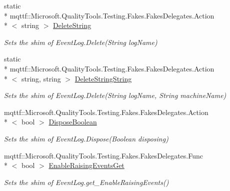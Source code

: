 \begin{DoxyCompactItemize}
static \\*
mqttf\-::\-Microsoft.\-Quality\-Tools.\-Testing.\-Fakes.\-Fakes\-Delegates.\-Action\\*
$<$ string $>$ \hyperlink{class_system_1_1_diagnostics_1_1_fakes_1_1_shim_event_log_ae24c5d172e64923387fe3a51c8167cd2}{Delete\-String}
\begin{DoxyCompactList}\small\item\em Sets the shim of Event\-Log.\-Delete(\-String log\-Name)\end{DoxyCompactList}\item 
static \\*
mqttf\-::\-Microsoft.\-Quality\-Tools.\-Testing.\-Fakes.\-Fakes\-Delegates.\-Action\\*
$<$ string, string $>$ \hyperlink{class_system_1_1_diagnostics_1_1_fakes_1_1_shim_event_log_a71464bcba246f1e8cacb0d9a7d8c17e4}{Delete\-String\-String}
\begin{DoxyCompactList}\small\item\em Sets the shim of Event\-Log.\-Delete(\-String log\-Name, String machine\-Name)\end{DoxyCompactList}\item 
mqttf\-::\-Microsoft.\-Quality\-Tools.\-Testing.\-Fakes.\-Fakes\-Delegates.\-Action\\*
$<$ bool $>$ \hyperlink{class_system_1_1_diagnostics_1_1_fakes_1_1_shim_event_log_adf5ff350d35afe036bd60f1ad692601d}{Dispose\-Boolean}
\begin{DoxyCompactList}\small\item\em Sets the shim of Event\-Log.\-Dispose(\-Boolean disposing)\end{DoxyCompactList}\item 
mqttf\-::\-Microsoft.\-Quality\-Tools.\-Testing.\-Fakes.\-Fakes\-Delegates.\-Func\\*
$<$ bool $>$ \hyperlink{class_system_1_1_diagnostics_1_1_fakes_1_1_shim_event_log_a15567f4ae93ce9c30d331100a84a88e8}{Enable\-Raising\-Events\-Get}
\begin{DoxyCompactList}\small\item\em Sets the shim of Event\-Log.\-get\-\_\-\-Enable\-Raising\-Events()\end{DoxyCompactList}\item 

\end{DoxyCompactItemize}
